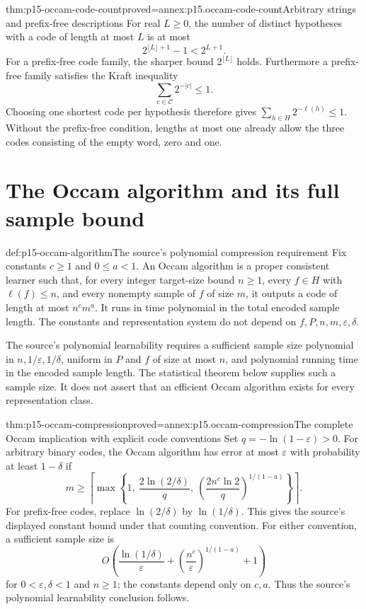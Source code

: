 \begin{hbtheorem}{thm:p15-occam-code-count}{proved=annex:p15.occam-code-count}{Arbitrary strings and prefix-free descriptions}
For real \(L\geq0\), the number of distinct hypotheses with a code
of length at most \(L\) is at most
\[
                 2^{\lfloor L\rfloor+1}-1<2^{L+1}.
\]
For a prefix-free code family, the sharper bound \(2^{\lfloor L\rfloor}\)
holds. Furthermore a prefix-free family satisfies the Kraft inequality
\[
                       \sum_{c\in\mathcal C}2^{-|c|}\leq1.
\]
Choosing one shortest code per hypothesis therefore gives
\(\sum_{h\in H}2^{-\ell(h)}\leq1\).
Without the prefix-free condition, lengths at most one already
allow the three codes consisting of the empty word, zero and one.
\end{hbtheorem}

\section{The Occam algorithm and its full sample bound}

\begin{hbdefinition}{def:p15-occam-algorithm}{The source's polynomial compression requirement}
Fix constants \(c\geq1\) and \(0\leq a<1\).
An Occam algorithm is a proper consistent learner such that,
for every integer target-size bound \(n\geq1\), every \(f\in H\)
with \(\ell(f)\leq n\), and every nonempty sample of \(f\) of
size \(m\), it outputs a code of length at most \(n^c m^a\).
It runs in time polynomial in the total encoded sample length.
The constants and representation system do not depend on
\(f,P,n,m,\varepsilon,\delta\).

The source's polynomial learnability requires a sufficient sample
size polynomial in \(n,1/\varepsilon,1/\delta\), uniform in
\(P\) and \(f\) of size at most \(n\), and polynomial running
time in the encoded sample length. The statistical theorem
below supplies such a sample size. It does not assert that
an efficient Occam algorithm exists for every representation class.
\end{hbdefinition}

\begin{hbtheorem}{thm:p15-occam-compression}{proved=annex:p15.occam-compression}{The complete Occam implication with explicit code conventions}
Set \(q=-\ln(1-\varepsilon)>0\).
For arbitrary binary codes, the Occam algorithm has error at most
\(\varepsilon\) with probability at least \(1-\delta\) if
\[
 m\geq\left\lceil\max\left\{
  1,\ \frac{2\ln(2/\delta)}q,\
       \left(\frac{2n^c\ln2}{q}\right)^{1/(1-a)}
                          \right\}\right\rceil .
\]
For prefix-free codes, replace \(\ln(2/\delta)\) by
\(\ln(1/\delta)\). This gives the source's displayed
constant bound under that counting convention.
For either convention, a sufficient sample size is
\[
 O\!\left(\frac{\ln(1/\delta)}{\varepsilon}
               +\left(\frac{n^c}{\varepsilon}\right)^{1/(1-a)}
               +1\right)
\]
for \(0<\varepsilon,\delta<1\) and \(n\geq1\); the constants depend
only on \(c,a\). Thus the source's polynomial learnability
conclusion follows.
\end{hbtheorem}

